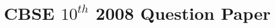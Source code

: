 \documentclass[journal,12pt,twocolumn]{IEEEtran}
\begin{document}
\makeatletter
{}
\makeatother
\let\StandardTheFigure\thefigure
\let\vec\mathbf
\renewcommand{\thefigure}{\theproblem}
\def\putbox#1#2#3{\makebox[0in][l]{\makebox[#1][l]{}\raisebox{\baselineskip}[0in][0in]{\raisebox{#2}[0in][0in]{#3}}}}
     \def\rightbox#1{\makebox[0in][r]{#1}}
     \def\centbox#1{\makebox[0in]{#1}}
     \def\topbox#1{\raisebox{-\baselineskip}[0in][0in]{#1}}
     \def\midbox#1{\raisebox{-0.5\baselineskip}[0in][0in]{#1}}
\vspace{3cm}
\title{CBSE $10^{th}$ 2008 Question Paper}

\maketitle
\newpage
\bigskip
\end{document}
